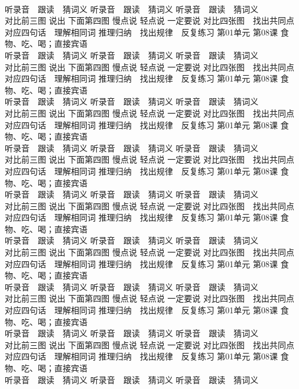 \documentclass[8pt]{extreport}
\begin{document}
\begin{CJK}{UTF8}{min}
\\	听录音　跟读　猜词义 听录音　跟读　猜词义 听录音　跟读　猜词义 
\\	对比前三图 说出 下面第四图 慢点说 轻点说 一定要说	对比四张图　找出共同点 对应四句话　理解相同词 推理归纳　找出规律　反复练习 第01单元 第08课 食物、吃、喝；直接宾语
\\	听录音　跟读　猜词义 听录音　跟读　猜词义 听录音　跟读　猜词义 
\\	对比前三图 说出 下面第四图 慢点说 轻点说 一定要说	对比四张图　找出共同点 对应四句话　理解相同词 推理归纳　找出规律　反复练习 第01单元 第08课 食物、吃、喝；直接宾语
\\	听录音　跟读　猜词义 听录音　跟读　猜词义 听录音　跟读　猜词义 
\\	对比前三图 说出 下面第四图 慢点说 轻点说 一定要说	对比四张图　找出共同点 对应四句话　理解相同词 推理归纳　找出规律　反复练习 第01单元 第08课 食物、吃、喝；直接宾语
\\	听录音　跟读　猜词义 听录音　跟读　猜词义 听录音　跟读　猜词义 
\\	对比前三图 说出 下面第四图 慢点说 轻点说 一定要说	对比四张图　找出共同点 对应四句话　理解相同词 推理归纳　找出规律　反复练习 第01单元 第08课 食物、吃、喝；直接宾语
\\	听录音　跟读　猜词义 听录音　跟读　猜词义 听录音　跟读　猜词义 
\\	对比前三图 说出 下面第四图 慢点说 轻点说 一定要说	对比四张图　找出共同点 对应四句话　理解相同词 推理归纳　找出规律　反复练习 第01单元 第08课 食物、吃、喝；直接宾语
\\	听录音　跟读　猜词义 听录音　跟读　猜词义 听录音　跟读　猜词义 
\\	对比前三图 说出 下面第四图 慢点说 轻点说 一定要说	对比四张图　找出共同点 对应四句话　理解相同词 推理归纳　找出规律　反复练习 第01单元 第08课 食物、吃、喝；直接宾语
\\	听录音　跟读　猜词义 听录音　跟读　猜词义 听录音　跟读　猜词义 
\\	对比前三图 说出 下面第四图 慢点说 轻点说 一定要说	对比四张图　找出共同点 对应四句话　理解相同词 推理归纳　找出规律　反复练习 第01单元 第08课 食物、吃、喝；直接宾语
\\	听录音　跟读　猜词义 听录音　跟读　猜词义 听录音　跟读　猜词义 
\\	对比前三图 说出 下面第四图 慢点说 轻点说 一定要说	对比四张图　找出共同点 对应四句话　理解相同词 推理归纳　找出规律　反复练习 第01单元 第08课 食物、吃、喝；直接宾语
\\	听录音　跟读　猜词义 听录音　跟读　猜词义 听录音　跟读　猜词义 

\end{CJK}
\end{document}
